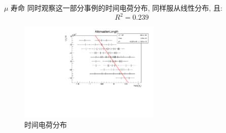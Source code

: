 \documentclass[10pt]{beamer}
\begin{document}
\begin{frame}[label={sec:org90e98c7}]{\(\mu\) 寿命}
同时观察这一部分事例的时间电荷分布, 同样服从线性分布, 且:
\begin{equation}
\label{eq:8}
R^2 = 0.239
\end{equation}
\begin{figure}[htbp]
\centering
\includegraphics[width=0.6\textwidth]{../../DetectorPerform/AttenuationLength/figs/ReAttenuationLength.pdf}
\caption{时间电荷分布}
\end{figure}
\end{frame}
\end{document}
